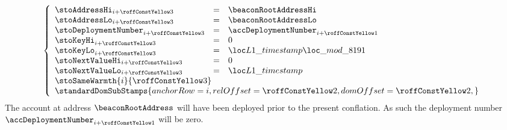 \item[\underline{\underline{Storing the \inst{TIMESTAMP} in the state:}}]
	\[
		\left\{ \begin{array}{lclr}
			\stoAddressHi        _{i + \roffTxSkipSysiBeaconRootSystemContractStorageSetBeaconRoot} & = & \beaconRootAddressHi             \\
			\stoAddressLo        _{i + \roffTxSkipSysiBeaconRootSystemContractStorageSetBeaconRoot} & = & \beaconRootAddressLo             \\
			\stoDeploymentNumber _{i + \roffTxSkipSysiBeaconRootSystemContractStorageSetBeaconRoot} & = & \accDeploymentNumber             _{i + \roffTxSkipSysiBeaconRootSystemContractAccount} \\
			\stoKeyHi            _{i + \roffTxSkipSysiBeaconRootSystemContractStorageSetBeaconRoot} & = & 0                                \\
			\stoKeyLo            _{i + \roffTxSkipSysiBeaconRootSystemContractStorageSetBeaconRoot} & = & \locLayerOneTimeStampModuloPrime \\
			\stoNextValueHi      _{i + \roffTxSkipSysiBeaconRootSystemContractStorageSetBeaconRoot} & = & 0                                \\
			\stoNextValueLo      _{i + \roffTxSkipSysiBeaconRootSystemContractStorageSetBeaconRoot} & = & \locLayerOneTimeStamp            \\
			\multicolumn{3}{l}{\stoSameWarmth  {i}{\roffTxSkipSysiBeaconRootSystemContractStorageSetBeaconRoot} } \\
			\multicolumn{3}{l}{
				\standardDomSubStamps {
					anchorRow = i                                                          ,
					relOffset = \roffTxSkipSysiBeaconRootSystemContractStorageSetTimestamp ,
					domOffset = \roffTxSkipSysiBeaconRootSystemContractStorageSetTimestamp ,
				}} \\
		\end{array} \right.
	\]
	\saNote{} \label{hub: tx skip: sysi: eip 4788: deployment number of system contract}
	The account at address $\beaconRootAddress$ will have been deployed prior to the present conflation.
	As such the deployment number
	$\accDeploymentNumber _{i + \roffTxSkipSysiBeaconRootSystemContractAccount}$
	will be zero.

